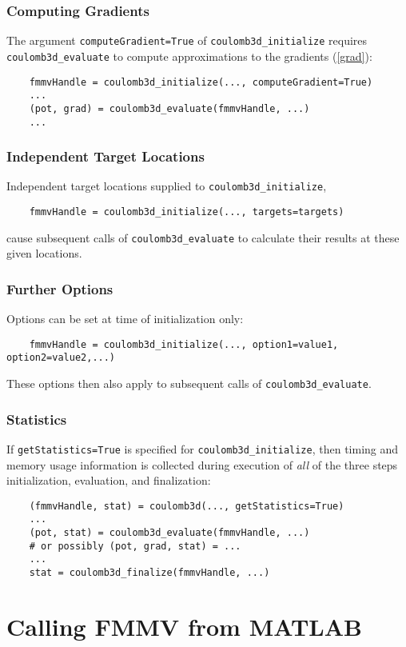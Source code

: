 \subsubsection*{Computing Gradients}
The argument \verb|computeGradient=True| of \verb|coulomb3d_initialize| requires
\verb|coulomb3d_evaluate| to compute approximations to the gradients (\ref{grad}):
\begin{verbatim}
    fmmvHandle = coulomb3d_initialize(..., computeGradient=True)
    ...
    (pot, grad) = coulomb3d_evaluate(fmmvHandle, ...)
    ...
\end{verbatim}
\subsubsection*{Independent Target Locations}
Independent target locations supplied to \verb|coulomb3d_initialize|,
\begin{verbatim}
    fmmvHandle = coulomb3d_initialize(..., targets=targets)
\end{verbatim}
cause subsequent calls of \verb|coulomb3d_evaluate| to calculate their results
at these given locations.
\subsubsection*{Further Options}
Options can be set at time of initialization only:
\begin{verbatim}
    fmmvHandle = coulomb3d_initialize(..., option1=value1, option2=value2,...)
\end{verbatim}
These options then also apply to subsequent calls of \verb|coulomb3d_evaluate|.
\subsubsection*{Statistics}
If \verb|getStatistics=True| is specified for \verb|coulomb3d_initialize|,
then timing and memory usage information is collected during execution of
{\em all} of the three steps initialization, evaluation, and finalization:
\begin{verbatim}
    (fmmvHandle, stat) = coulomb3d(..., getStatistics=True)
    ...
    (pot, stat) = coulomb3d_evaluate(fmmvHandle, ...) 
    # or possibly (pot, grad, stat) = ...
    ...
    stat = coulomb3d_finalize(fmmvHandle, ...)
\end{verbatim}

\section{Calling FMMV from MATLAB}
